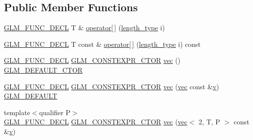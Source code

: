 \subsection*{Public Member Functions}
\begin{DoxyCompactItemize}
\item 
\mbox{\hyperlink{setup_8hpp_ab2d052de21a70539923e9bcbf6e83a51}{G\+L\+M\+\_\+\+F\+U\+N\+C\+\_\+\+D\+E\+CL}} T \& \mbox{\hyperlink{structglm_1_1vec_3_012_00_01_t_00_01_q_01_4_abfa1d6705c2f4956cb7beccc917de27d}{operator\mbox{[}$\,$\mbox{]}}} (\mbox{\hyperlink{structglm_1_1vec_3_012_00_01_t_00_01_q_01_4_af8b652526ec88c8513b2a8c05bf92441}{length\+\_\+type}} i)
\item 
\mbox{\hyperlink{setup_8hpp_ab2d052de21a70539923e9bcbf6e83a51}{G\+L\+M\+\_\+\+F\+U\+N\+C\+\_\+\+D\+E\+CL}} T const  \& \mbox{\hyperlink{structglm_1_1vec_3_012_00_01_t_00_01_q_01_4_ac475335b291db6f155d9d8f4ab3b6373}{operator\mbox{[}$\,$\mbox{]}}} (\mbox{\hyperlink{structglm_1_1vec_3_012_00_01_t_00_01_q_01_4_af8b652526ec88c8513b2a8c05bf92441}{length\+\_\+type}} i) const
\item 
\mbox{\hyperlink{setup_8hpp_ab2d052de21a70539923e9bcbf6e83a51}{G\+L\+M\+\_\+\+F\+U\+N\+C\+\_\+\+D\+E\+CL}} \mbox{\hyperlink{setup_8hpp_ad34178a09666081abdb573c14d1f4a5a}{G\+L\+M\+\_\+\+C\+O\+N\+S\+T\+E\+X\+P\+R\+\_\+\+C\+T\+OR}} \mbox{\hyperlink{structglm_1_1vec_3_012_00_01_t_00_01_q_01_4_a5f9f2f93b75d46552dc284dcbc1bb2d5}{vec}} () \mbox{\hyperlink{setup_8hpp_afb97a4e995bc004c0cbbfa22125b80ba}{G\+L\+M\+\_\+\+D\+E\+F\+A\+U\+L\+T\+\_\+\+C\+T\+OR}}
\item 
\mbox{\hyperlink{setup_8hpp_ab2d052de21a70539923e9bcbf6e83a51}{G\+L\+M\+\_\+\+F\+U\+N\+C\+\_\+\+D\+E\+CL}} \mbox{\hyperlink{setup_8hpp_ad34178a09666081abdb573c14d1f4a5a}{G\+L\+M\+\_\+\+C\+O\+N\+S\+T\+E\+X\+P\+R\+\_\+\+C\+T\+OR}} \mbox{\hyperlink{structglm_1_1vec_3_012_00_01_t_00_01_q_01_4_ad1785b216e3d6fa5f833c4cd58863cc4}{vec}} (\mbox{\hyperlink{structglm_1_1vec}{vec}} const \&\mbox{\hyperlink{_s_d_l__opengl_8h_a10a82eabcb59d2fcd74acee063775f90}{v}}) \mbox{\hyperlink{setup_8hpp_aefce7051c376a64ba89fa93a9f63bc2c}{G\+L\+M\+\_\+\+D\+E\+F\+A\+U\+LT}}
\item 
{\footnotesize template$<$qualifier P$>$ }\\\mbox{\hyperlink{setup_8hpp_ab2d052de21a70539923e9bcbf6e83a51}{G\+L\+M\+\_\+\+F\+U\+N\+C\+\_\+\+D\+E\+CL}} \mbox{\hyperlink{setup_8hpp_ad34178a09666081abdb573c14d1f4a5a}{G\+L\+M\+\_\+\+C\+O\+N\+S\+T\+E\+X\+P\+R\+\_\+\+C\+T\+OR}} \mbox{\hyperlink{structglm_1_1vec_3_012_00_01_t_00_01_q_01_4_a7eb23dcef5e913dc1e07d004db53d201}{vec}} (\mbox{\hyperlink{structglm_1_1vec}{vec}}$<$ 2, T, P $>$ const \&\mbox{\hyperlink{_s_d_l__opengl_8h_a10a82eabcb59d2fcd74acee063775f90}{v}})

\end{DoxyCompactItemize}
